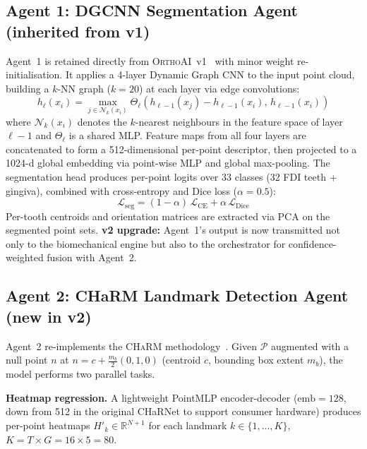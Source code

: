 \documentclass[10pt,twocolumn]{article}
\newcommand{\orthoai}{\textsc{OrthoAI}}
\newcommand{\charm}{\textsc{CHaRM}}
\newcommand{\R}{\mathbb{R}}
\newcommand{\vone}{\orthoai{}~v1}
\newcommand{\NEW}[1]{\textbf{\textcolor{blue!70!black}{#1}}}  %
\begin{document}
\subsection{Agent 1: DGCNN Segmentation Agent (inherited from v1)}

Agent~1 is retained directly from \vone{}~\cite{lansiaux2026orthoaiv1}
with minor weight re-initialisation.
It applies a 4-layer Dynamic Graph CNN to the input point cloud,
building a $k$-NN graph ($k=20$) at each layer via edge convolutions:
\begin{equation}
  h_\ell(x_i) = \max_{j \in \mathcal{N}_k(x_i)}
    \Theta_\ell\!\left(h_{\ell-1}(x_j) - h_{\ell-1}(x_i),\, h_{\ell-1}(x_i)\right)
\end{equation}
where $\mathcal{N}_k(x_i)$ denotes the $k$-nearest neighbours in the feature
space of layer $\ell - 1$ and $\Theta_\ell$ is a shared MLP.
Feature maps from all four layers are concatenated to form a 512-dimensional
per-point descriptor, then projected to a 1024-d global embedding via
point-wise MLP and global max-pooling.
The segmentation head produces per-point logits over 33 classes
(32 FDI teeth + gingiva), combined with cross-entropy and Dice loss
($\alpha = 0.5$):
\begin{equation}
  \mathcal{L}_\text{seg} = (1-\alpha)\,\mathcal{L}_\text{CE} +
    \alpha\,\mathcal{L}_\text{Dice}
\end{equation}
Per-tooth centroids and orientation matrices are extracted via PCA on
the segmented point sets.
\textbf{v2 upgrade:} Agent~1's output is now transmitted not only to the
biomechanical engine but also to the orchestrator for confidence-weighted
fusion with Agent~2.

\subsection{\NEW{Agent 2: CHaRM Landmark Detection Agent (new in v2)}}

Agent~2 re-implements the \charm{} methodology~\cite{rodriguez2025charm}.
Given $\mathcal{P}$ augmented with a null point $n$ at
$n = c + \frac{m_b}{2}(0,1,0)$ (centroid $c$, bounding box extent $m_b$),
the model performs two parallel tasks.

\textbf{Heatmap regression.}
A lightweight PointMLP encoder-decoder ($\text{emb}=128$, down from 512 in
the original CHaRNet to support consumer hardware)
produces per-point heatmaps $\hat{H}'_k \in \R^{N+1}$ for each
landmark $k \in \{1,...,K\}$, $K = T \times G = 16 \times 5 = 80$.
\end{document}
